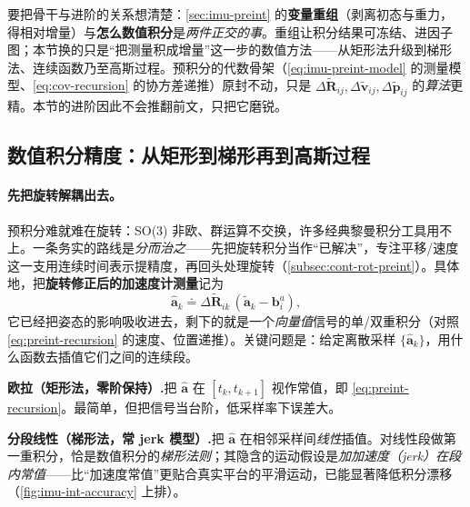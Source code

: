 \begin{insight}\label{ins:advanced-orthogonal}
要把骨干与进阶的关系想清楚：\cref{sec:imu-preint} 的\textbf{变量重组}（剥离初态与重力，得相对增量）与\textbf{怎么数值积分}是\emph{两件正交的事}。重组让积分结果可冻结、进因子图；本节换的只是“把测量积成增量”这一步的数值方法——从矩形法升级到梯形法、连续函数乃至高斯过程。预积分的代数骨架（\cref{eq:imu-preint-model} 的测量模型、\cref{eq:cov-recursion} 的协方差递推）原封不动，只是 $\Delta\tilde{\mathbf R}_{ij},\Delta\tilde{\mathbf v}_{ij},\Delta\tilde{\mathbf p}_{ij}$ 的\emph{算法}更精。本节的进阶因此不会推翻前文，只把它磨锐。
\end{insight}

\subsection{数值积分精度：从矩形到梯形再到高斯过程}
\label{subsec:numint-accuracy}

\paragraph{先把旋转解耦出去。}
预积分难就难在旋转：SO(3) 非欧、群运算不交换，许多经典黎曼积分工具用不上。一条务实的路线是\emph{分而治之}——先把旋转积分当作“已解决”，专注平移/速度这一支用连续时间表示提精度，再回头处理旋转（\cref{subsec:cont-rot-preint}）\cite{carlone2026handbook}。具体地，把\textbf{旋转修正后的加速度计测量}记为
\begin{equation}
  \hat{\mathbf a}_k\doteq\Delta\tilde{\mathbf R}_{ik}\,(\tilde{\mathbf a}_k-\mathbf b_i^a),
  \label{eq:rot-corrected-acc}
\end{equation}
它已经把姿态的影响吸收进去，剩下的就是一个\emph{向量值}信号的单/双重积分（对照 \cref{eq:preint-recursion} 的速度、位置递推）。关键问题是：给定离散采样 $\{\hat{\mathbf a}_k\}$，用什么函数去插值它们之间的连续段。

\textbf{欧拉（矩形法，零阶保持）.}\;把 $\hat{\mathbf a}$ 在 $[t_k,t_{k+1}]$ 视作常值，即 \cref{eq:preint-recursion}。最简单，但把信号当台阶，低采样率下误差大。

\textbf{分段线性（梯形法，常 jerk 模型）.}\;把 $\hat{\mathbf a}$ 在相邻采样间\emph{线性}插值\cite{legentil2020idol}。对线性段做第一重积分，恰是数值积分的\emph{梯形法则}；其隐含的运动假设是\emph{加加速度（jerk）在段内常值}——比“加速度常值”更贴合真实平台的平滑运动，已能显著降低积分漂移（\cref{fig:imu-int-accuracy} 上排）。

